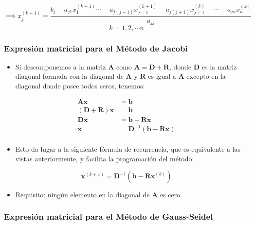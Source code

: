 \documentclass[openany]{book}
\providecommand{\tightlist}{%
  \setlength{\itemsep}{0pt}\setlength{\parskip}{0pt}}
\begin{document}
\[
\implies
x_j^{(k+1)} = \frac{b_j - a_{j1}x_1^{(k+1)} \cdots - a_{j(j-1)}x_{j-1}^{(k+1)} - a_{j(j+1)}x_{j+1}^{(k)} - \cdots - a_{jn}x_n^{(k)}}{ a_{jj}}
\]
\[
k=1, 2, \cdots n
\]

\hypertarget{expresiuxf3n-matricial-para-el-muxe9todo-de-jacobi}{%
\subsubsection{Expresión matricial para el Método de Jacobi}\label{expresiuxf3n-matricial-para-el-muxe9todo-de-jacobi}}

\begin{itemize}
\tightlist
\item
  Si descomponemos a la matriz \(\mathbf{A}\) como \(\mathbf{A=D+R}\), donde \(\mathbf{D}\) es la matriz diagonal formada con la diagonal de \(\mathbf{A}\) y \(\mathbf{R}\) es igual a \(\mathbf{A}\) excepto en la diagonal donde posee todos ceros, tenemos:
\end{itemize}

\begin{align*} 
\mathbf{Ax} &= \mathbf{b} \\
\mathbf{(D+R)x} &= \mathbf{b} \\
\mathbf{Dx} &= \mathbf{b} - \mathbf{Rx}  \\
\mathbf{x} &= \mathbf{D}^{-1} (\mathbf{b} - \mathbf{Rx})  \\
\end{align*}

\begin{itemize}
\tightlist
\item
  Esto da lugar a la siguiente fórmula de recurrencia, que es equivalente a las vistas anteriormente, y facilita la programación del método:
\end{itemize}

\[
\mathbf{x}^{(k+1)} = \mathbf{D}^{-1} (\mathbf{b} - \mathbf{Rx}^{(k)}) 
\]

\begin{itemize}
\tightlist
\item
  Requisito: ningún elemento en la diagonal de \(\mathbf{A}\) es cero.
\end{itemize}

\hypertarget{expresiuxf3n-matricial-para-el-muxe9todo-de-gauss-seidel}{%
\subsubsection{Expresión matricial para el Método de Gauss-Seidel}\label{expresiuxf3n-matricial-para-el-muxe9todo-de-gauss-seidel}}
\end{document}
